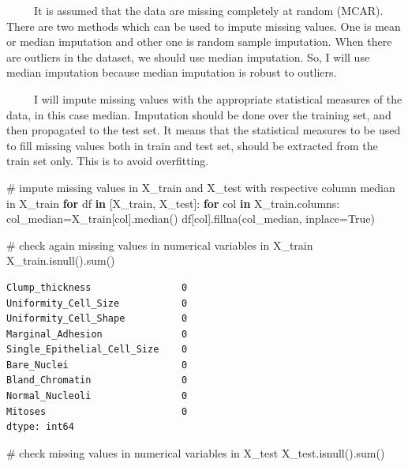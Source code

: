 \documentclass[
  letterpaper,
  DIV=11,
  numbers=noendperiod]{scrreprt}
\newenvironment{Shaded}{\begin{snugshade}}{\end{snugshade}}
\newcommand{\BuiltInTok}[1]{\textcolor[rgb]{0.00,0.23,0.31}{#1}}
\newcommand{\CommentTok}[1]{\textcolor[rgb]{0.37,0.37,0.37}{#1}}
\newcommand{\ControlFlowTok}[1]{\textcolor[rgb]{0.00,0.23,0.31}{\textbf{#1}}}
\newcommand{\KeywordTok}[1]{\textcolor[rgb]{0.00,0.23,0.31}{\textbf{#1}}}
\newcommand{\NormalTok}[1]{\textcolor[rgb]{0.00,0.23,0.31}{#1}}
\newcommand{\OperatorTok}[1]{\textcolor[rgb]{0.37,0.37,0.37}{#1}}
\newcommand{\VariableTok}[1]{\textcolor[rgb]{0.07,0.07,0.07}{#1}}
\begin{document}
~~~~~It is assumed that the data are missing completely at random
(MCAR). There are two methods which can be used to impute missing
values. One is mean or median imputation and other one is random sample
imputation. When there are outliers in the dataset, we should use median
imputation. So, I will use median imputation because median imputation
is robust to outliers.

~~~~~I will impute missing values with the appropriate statistical
measures of the data, in this case median. Imputation should be done
over the training set, and then propagated to the test set. It means
that the statistical measures to be used to fill missing values both in
train and test set, should be extracted from the train set only. This is
to avoid overfitting.

\begin{Shaded}
\begin{Highlighting}[]
\CommentTok{\# impute missing values in X\_train and X\_test with respective column median in X\_train}
\ControlFlowTok{for}\NormalTok{ df }\KeywordTok{in}\NormalTok{ [X\_train, X\_test]:}
    \ControlFlowTok{for}\NormalTok{ col }\KeywordTok{in}\NormalTok{ X\_train.columns:}
\NormalTok{        col\_median}\OperatorTok{=}\NormalTok{X\_train[col].median()}
\NormalTok{        df[col].fillna(col\_median, inplace}\OperatorTok{=}\VariableTok{True}\NormalTok{)  }
\end{Highlighting}
\end{Shaded}

\begin{Shaded}
\begin{Highlighting}[]
\CommentTok{\# check again missing values in numerical variables in X\_train}
\NormalTok{X\_train.isnull().}\BuiltInTok{sum}\NormalTok{()}
\end{Highlighting}
\end{Shaded}

\begin{verbatim}
Clump_thickness                0
Uniformity_Cell_Size           0
Uniformity_Cell_Shape          0
Marginal_Adhesion              0
Single_Epithelial_Cell_Size    0
Bare_Nuclei                    0
Bland_Chromatin                0
Normal_Nucleoli                0
Mitoses                        0
dtype: int64
\end{verbatim}

\begin{Shaded}
\begin{Highlighting}[]
\CommentTok{\# check missing values in numerical variables in X\_test}
\NormalTok{X\_test.isnull().}\BuiltInTok{sum}\NormalTok{()}
\end{Highlighting}
\end{Shaded}
\end{document}
